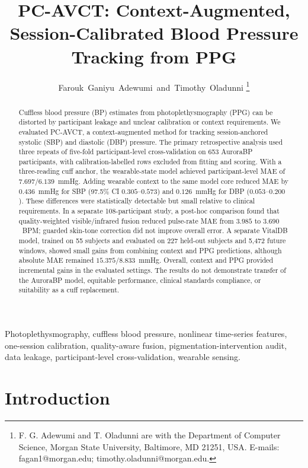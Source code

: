 \documentclass[journal]{IEEEtran}
\begin{document}
\title{PC-AVCT: Context-Augmented, Session-Calibrated Blood Pressure Tracking from PPG}
\author{Farouk~Ganiyu~Adewumi~and~Timothy~Oladunni
\thanks{F. G. Adewumi and T. Oladunni are with the Department of Computer Science, Morgan State University, Baltimore, MD 21251, USA. E-mails: fagan1@morgan.edu; timothy.oladunni@morgan.edu.}}
\maketitle
\begin{abstract}
Cuffless blood pressure (BP) estimates from photoplethysmography (PPG) can be distorted by participant leakage and unclear calibration or context requirements. We evaluated PC-AVCT, a context-augmented method for tracking session-anchored systolic (SBP) and diastolic (DBP) pressure. The primary retrospective analysis used three repeats of five-fold participant-level cross-validation on 653 AuroraBP participants, with calibration-labelled rows excluded from fitting and scoring. With a three-reading cuff anchor, the wearable-state model achieved participant-level MAE of $7.697$/$6.139$~mmHg. Adding wearable context to the same model core reduced MAE by $0.436$~mmHg for SBP (97.5\% CI $0.305$--$0.573$) and $0.126$~mmHg for DBP ($0.053$--$0.200$). These differences were statistically detectable but small relative to clinical requirements. In a separate 108-participant study, a post-hoc comparison found that quality-weighted visible/infrared fusion reduced pulse-rate MAE from $3.985$ to $3.690$~BPM; guarded skin-tone correction did not improve overall error. A separate VitalDB model, trained on 55 subjects and evaluated on 227 held-out subjects and 5{,}472 future windows, showed small gains from combining context and PPG predictions, although absolute MAE remained $15.375$/$8.833$~mmHg. Overall, context and PPG provided incremental gains in the evaluated settings. The results do not demonstrate transfer of the AuroraBP model, equitable performance, clinical standards compliance, or suitability as a cuff replacement.
\end{abstract}
\begin{IEEEkeywords}
Photoplethysmography, cuffless blood pressure, nonlinear time-series features, one-session calibration, quality-aware fusion, pigmentation-intervention audit, data leakage, participant-level cross-validation, wearable sensing.
\end{IEEEkeywords}
\section{Introduction}
\label{sec:intro}
\end{document}
